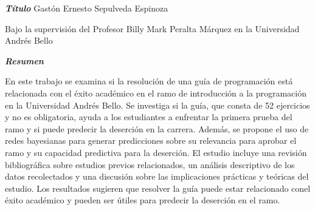 \begin{center}
    \textbf{\LARGE \textit{Título}}
    \vfill
    Gastón Ernesto Sepulveda Espinoza

    Bajo la supervisión del Profesor Billy Mark Peralta Márquez en la Universidad Andrés Bello

\end{center}
\vfill
\begin{center}
    \textbf{\LARGE \textit{Resumen}}
\end{center}

En este trabajo se examina si la resolución de una guía de programación está relacionada con el éxito académico en el ramo de introducción a la programación en la Universidad Andrés Bello. Se investiga si la guía, que consta de 52 ejercicios y no es obligatoria, ayuda a los estudiantes a enfrentar la primera prueba del ramo y si puede predecir la deserción en la carrera. 
Además, se propone el uso de redes bayesianas para generar predicciones sobre su relevancia para aprobar el ramo y su capacidad predictiva para la deserción. El estudio incluye una revisión bibliográfica sobre estudios previos relacionados, un análisis descriptivo de los datos recolectados y una discusión sobre las implicaciones prácticas y teóricas del estudio. 
Los resultados sugieren que resolver la guía puede estar relacionado conel éxito académico y pueden ser útiles para predecir la deserción en el ramo.
\vfill